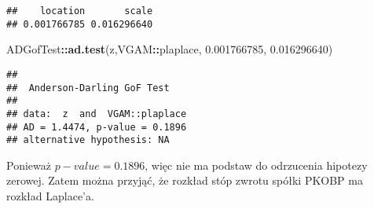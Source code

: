 \documentclass[polish,]{book}
\newenvironment{Shaded}{\begin{snugshade}}{\end{snugshade}}
\newcommand{\FloatTok}[1]{\textcolor[rgb]{0.00,0.00,0.81}{#1}}
\newcommand{\KeywordTok}[1]{\textcolor[rgb]{0.13,0.29,0.53}{\textbf{#1}}}
\newcommand{\NormalTok}[1]{#1}
\newcommand{\OperatorTok}[1]{\textcolor[rgb]{0.81,0.36,0.00}{\textbf{#1}}}
\begin{document}
\begin{verbatim}
##    location       scale 
## 0.001766785 0.016296640
\end{verbatim}

\begin{Shaded}
\begin{Highlighting}[]
\NormalTok{ADGofTest}\OperatorTok{::}\KeywordTok{ad.test}\NormalTok{(z,VGAM}\OperatorTok{::}\NormalTok{plaplace, }\FloatTok{0.001766785}\NormalTok{, }\FloatTok{0.016296640}\NormalTok{)}
\end{Highlighting}
\end{Shaded}

\begin{verbatim}
## 
##  Anderson-Darling GoF Test
## 
## data:  z  and  VGAM::plaplace
## AD = 1.4474, p-value = 0.1896
## alternative hypothesis: NA
\end{verbatim}

Ponieważ \(p-value = 0.1896\), więc nie ma podstaw do odrzucenia hipotezy zerowej.
Zatem można przyjąć, że rozkład stóp zwrotu spółki PKOBP ma rozkład Laplace'a.
\end{document}

